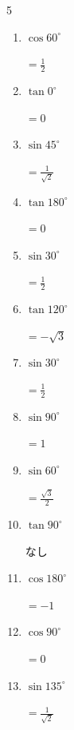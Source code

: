 \begin{multicols}{5}
\begin{enumerate}
        $\displaystyle =\frac{1}{\sqrt{2}}$

  \item $\displaystyle \cos{60^\circ}$

        $\displaystyle =\frac{1}{2}$

\columnbreak %

  \item $\displaystyle \tan{0^\circ}$

        $\displaystyle =0$

  \item $\displaystyle \sin{45^\circ}$

        $\displaystyle =\frac{1}{\sqrt{2}}$

  \item $\displaystyle \tan{180^\circ}$

        $\displaystyle =0$

  \item $\displaystyle \sin{30^\circ}$

        $\displaystyle =\frac{1}{2}$

  \item $\displaystyle \tan{120^\circ}$

        $\displaystyle =-\sqrt{3}$

  \item $\displaystyle \sin{30^\circ}$

        $\displaystyle =\frac{1}{2}$

  \item $\displaystyle \sin{90^\circ}$

        $\displaystyle =1$

  \item $\displaystyle \sin{60^\circ}$

        $\displaystyle =\frac{\sqrt{3}}{2}$

  \item $\displaystyle \tan{90^\circ}$

        $\displaystyle なし$

  \item $\displaystyle \cos{180^\circ}$

        $\displaystyle =-1$

  \item $\displaystyle \cos{90^\circ}$

        $\displaystyle =0$

  \item $\displaystyle \sin{135^\circ}$

        $\displaystyle =\frac{1}{\sqrt{2}}$


\end{enumerate}
\end{multicols}

